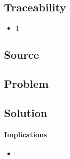 
\section{}

	\subsection{Traceability} 
		\begin{itemize}
			\item 1
		\end{itemize}

	\subsection{Source} \cite{book:design-patterns}


	\subsection{Problem}


	\subsection{Solution} 



\paragraph{Implications}
\begin{itemize}
	\item
\end{itemize}
